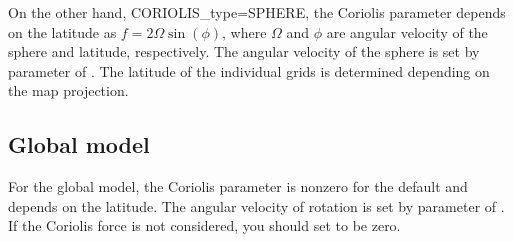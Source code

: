 On the other hand, CORIOLIS\_type=SPHERE, 
the Coriolis parameter depends on the latitude as $f = 2\Omega \sin(\phi)$, 
where $\Omega$ and $\phi$ are angular velocity of the sphere and latitude, respectively.
The angular velocity of the sphere is set by  parameter of .
The latitude of the individual grids is determined depending on the map projection.

\subsection{Global model}
For the global model, 
the Coriolis parameter is nonzero for the default and depends on the latitude. 
The angular velocity of rotation is set by  parameter of .
If the Coriolis force is not considered, you should set  to be zero. 


